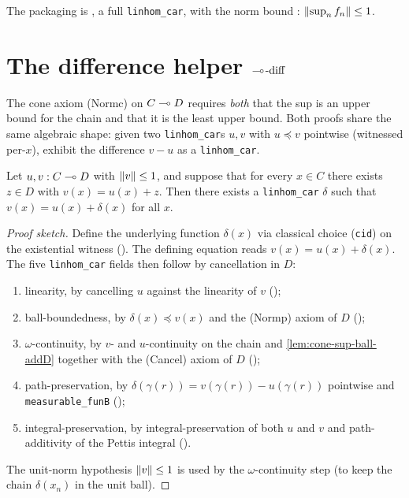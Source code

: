 The packaging is , a full
\texttt{linhom\_car}, with the norm bound
: $\lVert \sup_n f_n \rVert
\le 1$.

\section{The difference helper \texorpdfstring{$\multimap\!\text{-diff}$}{->hom\!-diff}}\label{sec:linhom-diff}

The cone axiom (Normc) on $C \multimap D$ requires \emph{both} that the
sup is an upper bound for the chain and that it is the least upper
bound. Both proofs share the same algebraic shape: given two
\texttt{linhom\_car}s $u, v$ with $u \preceq v$ pointwise (witnessed
per-$x$), exhibit the difference $v - u$ as a \texttt{linhom\_car}.

\begin{lemma}\label{lem:linhom-diff}
\rocqok{}
Let $u, v : C \multimap D$ with $\lVert v \rVert \le 1$, and suppose that for
every $x \in C$ there exists $z \in D$ with $v(x) = u(x) + z$. Then
there exists a \texttt{linhom\_car} $\delta$ such that
$v(x) = u(x) + \delta(x)$ for all $x$.
\end{lemma}

\begin{proof}[Proof sketch]
Define the underlying function $\delta(x)$ via classical choice
(\texttt{cid}) on the existential witness
(). The defining equation
 reads
$v(x) = u(x) + \delta(x)$. The five \texttt{linhom\_car} fields then
follow by cancellation in $D$:
\begin{enumerate}
\item linearity, by cancelling $u$ against the linearity of $v$
  ();
\item ball-boundedness, by $\delta(x) \preceq v(x)$ and the (Normp)
  axiom of $D$ ();
\item $\omega$-continuity, by $v$- and $u$-continuity on the chain
  and \autoref{lem:cone-sup-ball-addD} together with the (Cancel)
  axiom of $D$ ();
\item path-preservation, by $\delta(\gamma(r)) = v(\gamma(r)) -
  u(\gamma(r))$ pointwise and \texttt{measurable\_funB}
  ();
\item integral-preservation, by integral-preservation of both $u$
  and $v$ and path-additivity of the Pettis integral
  ().
\end{enumerate}
The unit-norm hypothesis $\lVert v \rVert \le 1$ is used by the
$\omega$-continuity step (to keep the chain $\delta(x_n)$ in the
unit ball).
\end{proof}

